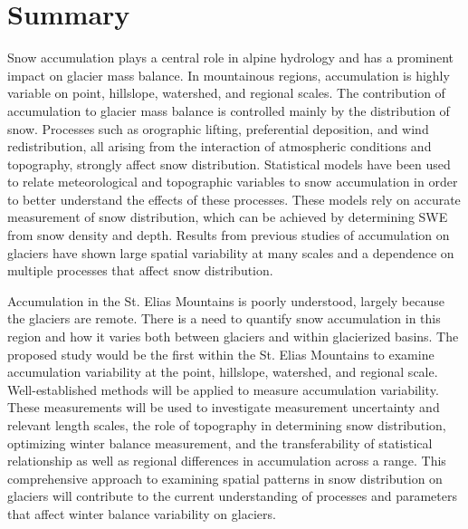 \documentclass[12pt]{article}
\begin{document}
\section{Summary}
Snow accumulation plays a central role in alpine hydrology and has a prominent impact on glacier mass balance. In mountainous regions, accumulation is highly variable on point, hillslope, watershed, and regional scales. The contribution of accumulation to glacier mass balance is controlled mainly by the distribution of snow. Processes such as orographic lifting, preferential deposition, and wind redistribution, all arising from the interaction of atmospheric conditions and topography, strongly affect snow distribution. Statistical models have been used to relate meteorological and topographic variables to snow accumulation in order to better understand the effects of these processes. These models rely on accurate measurement of snow distribution, which can be achieved by determining SWE from snow density and depth. Results from previous studies of accumulation on glaciers have shown large spatial variability at many scales and a dependence on multiple processes that affect snow distribution. 

Accumulation in the St. Elias Mountains is poorly understood, largely because the glaciers are remote. There is a need to quantify snow accumulation in this region and how it varies both between glaciers and within glacierized basins. The proposed study would be the first within the St. Elias Mountains to examine accumulation variability at the point, hillslope, watershed, and regional scale. Well-established methods will be applied to measure accumulation variability.  These measurements will be used to investigate measurement uncertainty and relevant length scales, the role of topography in determining snow distribution, optimizing winter balance measurement, and the transferability of statistical relationship as well as regional differences in accumulation across a range. This comprehensive approach to examining spatial patterns in snow distribution on glaciers will contribute to the current understanding of processes and parameters that affect winter balance variability on glaciers. 

\pagebreak


\end{document}
